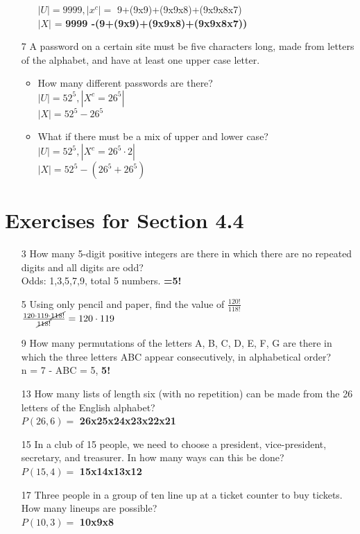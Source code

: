 \documentclass[12pt]{article}
\begin{document}
\begin{enumerate}
\begin{itemize}
		    $|U| = 9999, |x^c| =$ 9+(9x9)+(9x9x8)+(9x9x8x7)\\
		    $|X|$ = \textbf{9999 -(9+(9x9)+(9x9x8)+(9x9x8x7))}
	\end{itemize}
    \item [7] A password on a certain site must be five characters long, made from letters of the alphabet, and have at least one upper case letter.
	\begin{itemize}
	    \item How many different passwords are there?\\
		$|U| = 52^5, |X^c= 26^5|$\\
		$|X| = $\textbf{$52^5 - 26^5$}
	    \item What if there must be a mix of upper and lower case?\\
		$|U| = 52^5, |X^c= 26^5 \cdot 2|$\\
		$|X| = $\textbf{$52^5 - (26^5 + 26^5)$}
	\end{itemize}
\end{enumerate}
\section*{Exercises for Section 4.4}
\begin{enumerate}
    \item [3] How many 5-digit positive integers are there in which there are no repeated
digits and all digits are odd?\\
	Odds: 1,3,5,7,9, total 5 numbers. \textbf{=5!}
    \item [5] Using only pencil and paper, find the value of $\frac{120!}{118!}$\\
	$\frac{120\cdot 119 \cdot \cancel{118!}}{\cancel{118!}} = 120\cdot 119$
    \item [9] How many permutations of the letters A, B, C, D, E, F, G are there in which the
three letters ABC appear consecutively, in alphabetical order?\\
	n = 7 - ABC = 5, \textbf{5!}
    \item [13] How many lists of length six (with no repetition) can be made from the 26 letters
of the English alphabet?\\
	$P(26,6) =$ \textbf{26x25x24x23x22x21}
    \item [15] In a club of 15 people, we need to choose a president, vice-president, secretary,
and treasurer. In how many ways can this be done?\\
	$P(15, 4) =$ \textbf{15x14x13x12}
    \item [17] Three people in a group of ten line up at a ticket counter to buy tickets. How
many lineups are possible?\\
	$P(10, 3) =$ \textbf{10x9x8}
\end{enumerate}
\end{document}
